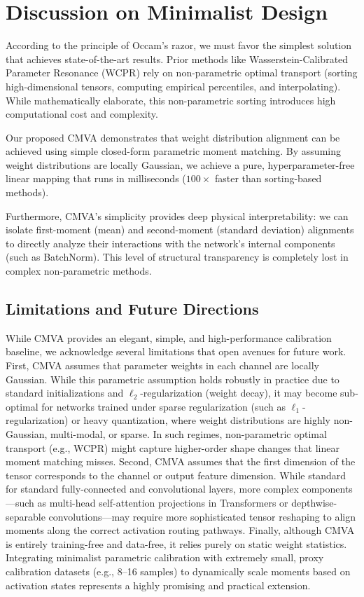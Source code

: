 \documentclass{article}
\theoremstyle{plain}
\theoremstyle{definition}
\theoremstyle{remark}
\begin{document}
\section{Discussion on Minimalist Design}
\label{sec:discussion}

According to the principle of Occam's razor, we must favor the simplest solution that achieves state-of-the-art results. Prior methods like Wasserstein-Calibrated Parameter Resonance (WCPR) rely on non-parametric optimal transport (sorting high-dimensional tensors, computing empirical percentiles, and interpolating). While mathematically elaborate, this non-parametric sorting introduces high computational cost and complexity.

Our proposed CMVA demonstrates that weight distribution alignment can be achieved using simple closed-form parametric moment matching. By assuming weight distributions are locally Gaussian, we achieve a pure, hyperparameter-free linear mapping that runs in milliseconds ($100\times$ faster than sorting-based methods). 

Furthermore, CMVA's simplicity provides deep physical interpretability: we can isolate first-moment (mean) and second-moment (standard deviation) alignments to directly analyze their interactions with the network's internal components (such as BatchNorm). This level of structural transparency is completely lost in complex non-parametric methods.

\subsection{Limitations and Future Directions}

While CMVA provides an elegant, simple, and high-performance calibration baseline, we acknowledge several limitations that open avenues for future work.
First, CMVA assumes that parameter weights in each channel are locally Gaussian. While this parametric assumption holds robustly in practice due to standard initializations and $\ell_2$-regularization (weight decay), it may become sub-optimal for networks trained under sparse regularization (such as $\ell_1$-regularization) or heavy quantization, where weight distributions are highly non-Gaussian, multi-modal, or sparse. In such regimes, non-parametric optimal transport (e.g., WCPR) might capture higher-order shape changes that linear moment matching misses.
Second, CMVA assumes that the first dimension of the tensor corresponds to the channel or output feature dimension. While standard for standard fully-connected and convolutional layers, more complex components—such as multi-head self-attention projections in Transformers or depthwise-separable convolutions—may require more sophisticated tensor reshaping to align moments along the correct activation routing pathways.
Finally, although CMVA is entirely training-free and data-free, it relies purely on static weight statistics. Integrating minimalist parametric calibration with extremely small, proxy calibration datasets (e.g., 8--16 samples) to dynamically scale moments based on activation states represents a highly promising and practical extension.
\end{document}
